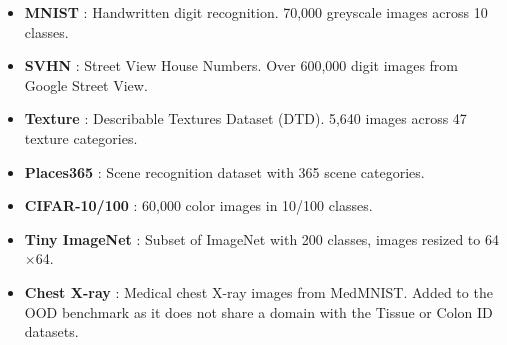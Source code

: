 \documentclass[10pt,twocolumn,letterpaper]{article}
\begin{document}
\begin{itemize}
    \item \textbf{MNIST} \citep{lecun1998gradient}: Handwritten digit recognition. 70,000 greyscale images across 10 classes.
    \item \textbf{SVHN} \citep{netzer2011reading}: Street View House Numbers. Over 600,000 digit images from Google Street View.
    \item \textbf{Texture} \citep{cimpoi2014describing}: Describable Textures Dataset (DTD). 5,640 images across 47 texture categories.
    \item \textbf{Places365} \citep{zhou2017places}: Scene recognition dataset with 365 scene categories.
    \item \textbf{CIFAR-10/100} \citep{cifar10}: 60,000 color images in 10/100 classes.
    \item \textbf{Tiny ImageNet} \citep{deng2009imagenet}: Subset of ImageNet with 200 classes, images resized to 64$\times$64.
    \item \textbf{Chest X-ray} \citep{yang2023medmnist}: Medical chest X-ray images from MedMNIST. Added to the OOD benchmark as it does not share a domain with the Tissue or Colon ID datasets.
\end{itemize}




\end{document}
